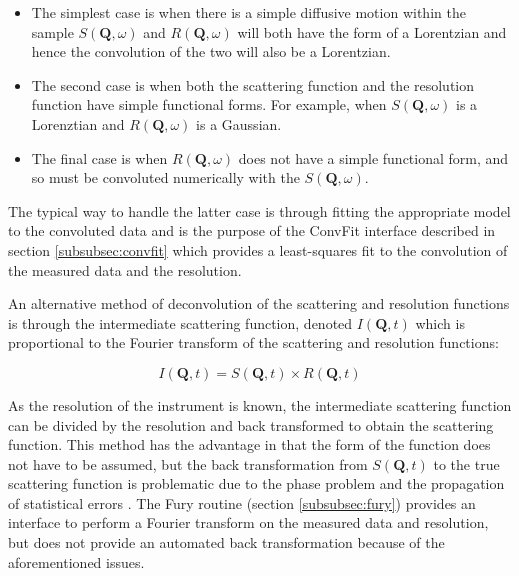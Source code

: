 \documentclass[paper=a4, fontsize=11pt]{scrartcl}	%
\numberwithin{equation}{section}															%
\numberwithin{figure}{section}																%
\numberwithin{table}{section}																%
\begin{document}
\begin{itemize}
\item The simplest case is when there is a simple diffusive motion within the sample $S(\mathbf{Q},\omega)$ and $R(\mathbf{Q},\omega)$ will both have the form of a Lorentzian and hence the convolution of the two will also be a Lorentzian.

\item The second case is when both the scattering function and the resolution function have simple functional forms. For example, when $S(\mathbf{Q},\omega)$ is a Lorenztian and $R(\mathbf{Q},\omega)$ is a Gaussian.

\item The final case is when $R(\mathbf{Q}, \omega)$ does not have a simple functional form, and so must be convoluted numerically with the $S(\mathbf{Q}, \omega)$.
\end{itemize}

The typical way to handle the latter case is through fitting the appropriate model to the convoluted data and is the purpose of the ConvFit interface described in section \ref{subsubsec:convfit} which provides a least-squares fit to the convolution of the measured data and the resolution.

An alternative method of deconvolution of the scattering and resolution functions is through the intermediate scattering function, denoted $I(\mathbf{Q}, t)$ which is proportional to the Fourier transform of the scattering and resolution functions:

\begin{equation}
I(\mathbf{Q}, t) = S(\mathbf{Q}, t) \times R(\mathbf{Q}, t)
\end{equation}

As the resolution of the instrument is known, the intermediate scattering function can be divided by the resolution and back transformed to obtain the scattering function. This method has the advantage in that the form of the function does not have to be assumed, but the back transformation from $S(\mathbf{Q}, t)$ to the true scattering function is problematic due to the phase problem \citep{dssivia2011} and the propagation of statistical errors \citep{wild1977measurement}. The Fury routine (section \ref{subsubsec:fury}) provides an interface to perform a Fourier transform on the measured data and resolution, but does not provide an automated back transformation because of the aforementioned issues.
\end{document}
